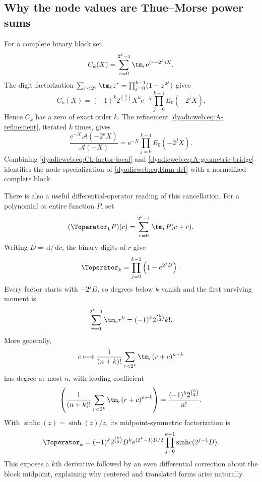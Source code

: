 \documentclass[11pt,oneside]{article}
\theoremstyle{definition}
\theoremstyle{remark}
\newcommand{\e}{\mathrm e}
\newcommand{\dd}{\,\mathrm d}
\begin{document}
\subsection{Why the node values are Thue--Morse power sums}

For a complete binary block set
\begin{equation}
 C_k(X)=\sum_{r=0}^{2^k-1}\tm_r\e^{(r-2^k)X}.              \label{dyadicweb:eq:Ck-local}
\end{equation}
The digit factorization
\(
 \sum_{r<2^k}\tm_rz^r=\prod_{j=0}^{k-1}(1-z^{2^j})
\)
gives
\begin{equation}
 C_k(X)=(-1)^k2^{\binom k2}X^k
 \e^{-X}\prod_{j=0}^{k-1}E_0(-2^jX).                     \label{dyadicweb:eq:Ck-factor-local}
\end{equation}
Hence $C_k$ has a zero of exact order $k$.  The refinement
\eqref{dyadicweb:eq:A-refinement}, iterated $k$ times, gives
\begin{equation}
 \frac{\e^{-X}\mathscr A(-2^kX)}{\mathscr A(-X)}
 =\e^{-X}\prod_{j=0}^{k-1}E_0(-2^jX).                    \label{dyadicweb:eq:A-geometric-bridge}
\end{equation}
Combining \eqref{dyadicweb:eq:Ck-factor-local} and \eqref{dyadicweb:eq:A-geometric-bridge} identifies the node
specialization of \eqref{dyadicweb:eq:Rmn-def} with a normalized complete block.

There is also a useful differential-operator reading of this cancellation.  For a polynomial
or entire function $P$, set
\begin{equation}
 (\Toperator_kP)(c)=\sum_{r=0}^{2^k-1}\tm_rP(c+r).         \label{dyadicq:eq:TM-operator}
\end{equation}
Writing $D=\dd/\dd c$, the binary digits of $r$ give
\begin{equation}
 \Toperator_k=\prod_{j=0}^{k-1}\left(1-e^{2^jD}\right). \label{dyadicq:eq:TM-factorization}
\end{equation}
Every factor starts with $-2^jD$, so degrees below $k$ vanish and the first surviving
moment is
\begin{equation}
 \sum_{r=0}^{2^k-1}\tm_rr^k=(-1)^k2^{\binom k2}k!.       \label{dyadicq:eq:first-TM-moment}
\end{equation}
More generally,
\begin{equation}
 c\longmapsto\frac1{(n+k)!}\sum_{r<2^k}\tm_r(r+c)^{n+k} \label{dyadicq:eq:TM-degree-n}
\end{equation}
has degree at most $n$, with leading coefficient
\begin{equation}
 [c^n]\left(\frac1{(n+k)!}\sum_{r<2^k}\tm_r(r+c)^{n+k}\right)
 =\frac{(-1)^k2^{\binom k2}}{n!}.                         \label{dyadicq:eq:TM-leading-coeff}
\end{equation}
With $\operatorname{sinhc}(z)=\sinh(z)/z$, its midpoint-symmetric factorization is
\begin{equation}
 \Toperator_k=(-1)^k2^{\binom k2}D^k e^{(2^k-1)D/2}
 \prod_{j=0}^{k-1}\operatorname{sinhc}(2^{j-1}D).        \label{dyadicq:eq:TM-sinhc}
\end{equation}
This exposes a $k$th derivative followed by an even differential correction about the
block midpoint, explaining why centered and translated forms arise naturally.
\end{document}

